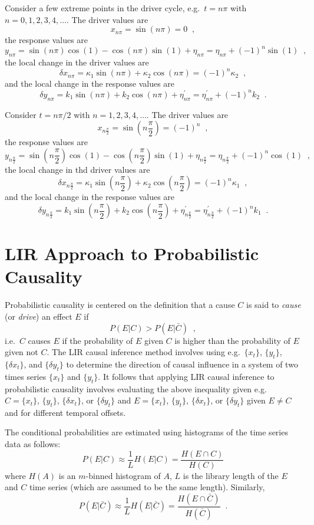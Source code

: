 \documentclass[a4paper,11pt]{article}
\begin{document}
Consider a few extreme points in the driver cycle, e.g.\ $t=n\pi$ with $n=0,1,2,3,4,\ldots$.  The driver values are
$$
x_{n\pi} = \sin(n\pi) = 0\;\;,
$$
the response values are
$$
y_{n\pi} = \sin(n\pi)\cos(1)-\cos(n\pi)\sin(1)+ \eta_{n\pi} = \eta_{n\pi} + \left(-1\right)^n\sin(1)\;\;,
$$
the local change in the driver values are
$$
\delta x_{n\pi} = \kappa_1\sin(n\pi)+\kappa_2\cos(n\pi) = \left(-1\right)^n \kappa_2\;\;,
$$
and the local change in the response values are
$$
\delta y_{n\pi} = k_1\sin(n\pi)+k_2\cos(n\pi)+\eta^\prime_{n\pi} = \eta^\prime_{n\pi} + \left(-1\right)^n k_2\;\;.
$$

Consider $t=n\pi/2$ with $n=1,2,3,4,\ldots$.  The driver values are
$$
x_{n\frac{\pi}{2}} = \sin\left(n\frac{\pi}{2}\right) = (-1)^n\;\;,
$$
the response values are
$$
y_{n\frac{\pi}{2}} = \sin\left(n\frac{\pi}{2}\right)\cos(1)-\cos\left(n\frac{\pi}{2}\right)\sin(1)+ \eta_{n\frac{\pi}{2}} = \eta_{n\frac{\pi}{2}} + (-1)^n\cos(1)\;\;,
$$
the local change in thd driver values are
$$
\delta x_{n\frac{\pi}{2}} = \kappa_1\sin\left(n\frac{\pi}{2}\right)+\kappa_2\cos\left(n\frac{\pi}{2}\right) = \left(-1\right)^n \kappa_1\;\;,
$$
and the local change in the response values are
$$
\delta y_{n\frac{\pi}{2}} = k_1\sin\left(n\frac{\pi}{2}\right)+k_2\cos\left(n\frac{\pi}{2}\right)+\eta^\prime_{n\frac{\pi}{2}} = \eta^\prime_{n\frac{\pi}{2}} + \left(-1\right)^n k_1\;\;.
$$

\section{LIR Approach to Probabilistic Causality}
Probabilistic causality is centered on the definition that a cause $C$ is said to {\em cause} (or {\em drive}) an effect $E$ if
$$
P\left(E|C\right) > P\left(E|\bar{C}\right)\;\;,
$$
i.e.\ $C$ causes $E$ if the probability of $E$ given $C$ is higher than the probability of $E$ given not $C$.  The LIR causal inference method involves using e.g.\ $\{x_t\}$, $\{y_t\}$, $\{\delta x_t\}$, and $\{\delta y_t\}$ to determine the direction of causal influence in a system of two times series $\{x_t\}$ and $\{y_t\}$.  It follows that applying LIR causal inference to probabilistic causality involves evaluating the above inequality given e.g.\ $C = \{x_t\}$, $\{y_t\}$, $\{\delta x_t\}$, or $\{\delta y_t\}$ and $E = \{x_t\}$, $\{y_t\}$, $\{\delta x_t\}$, or $\{\delta y_t\}$ given $E\neq C$ and for different temporal offsets.

The conditional probabilities are estimated using histograms of the time series data as follows:
$$
P\left(E|C\right) \approx \frac{1}{L} H\left(E|C\right) = \frac{H\left(E\cap C\right)}{H(C)}
$$
where $H(A)$ is an $m$-binned histogram of $A$, $L$ is the library length of the $E$ and $C$ time series (which are assumed to be the same length).  Similarly,
$$
P\left(E|\bar{C}\right) \approx \frac{1}{L} H\left(E|\bar{C}\right) = \frac{H\left(E\cap \bar{C}\right)}{H(\bar{C})}\;\;.
$$
\end{document}
